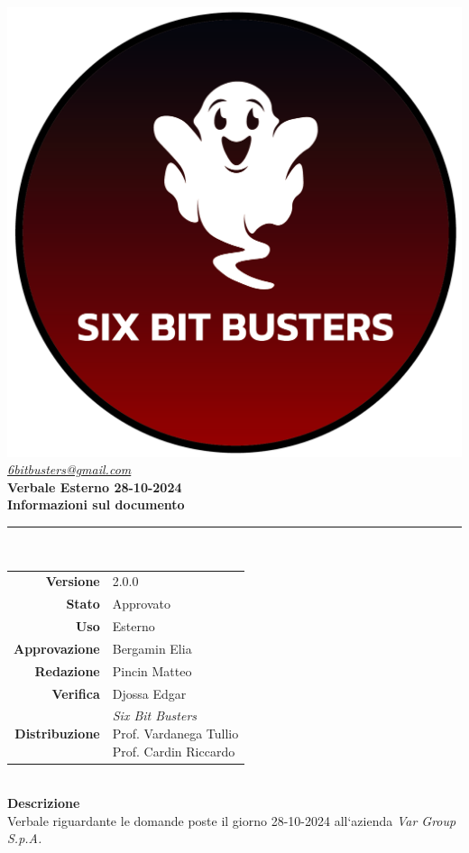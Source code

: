 \thispagestyle{empty}
\renewcommand{\arraystretch}{1.3}


\begin{titlepage}
	\begin{center}
		
	\includegraphics[scale = 0.7]{template/images/logo-circle.png}
	\\[1cm]
	\href{mailto:6bitbusters@gmail.com}		      	
	{\large{\textit{6bitbusters@gmail.com} } }\\[1cm]
	
	\Huge \textbf{Verbale Esterno 28-10-2024} \\[1cm]

	\large \textbf{Informazioni sul documento} \\
	\rule{0.6\textwidth}{0.4pt}
	\\[0.5cm]
	\begin{tabular}{r|l}
		\textbf{Versione} & 2.0.0\\
		\textbf{Stato} & Approvato\\
		\textbf{Uso} & Esterno\\                         
		\textbf{Approvazione} & Bergamin Elia \\                      
		\textbf{Redazione} & Pincin Matteo\\ 
		\textbf{Verifica} & Djossa Edgar\\                         
		\textbf{Distribuzione} & \parbox[t]{5cm}{ \textit{Six Bit Busters} \\ Prof. Vardanega Tullio 
	 \\ Prof. Cardin Riccardo}
	\end{tabular}	
	\\[1.2cm]

	\large \textbf{Descrizione} \\
	Verbale riguardante le domande poste il giorno 28-10-2024 all`azienda \textit{Var Group S.p.A.}
	
	\end{center}
\end{titlepage}
